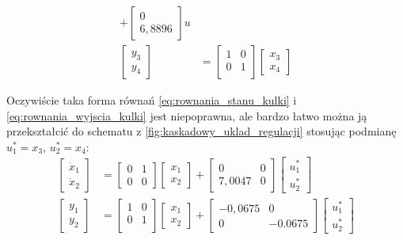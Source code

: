 \begin{align}
+
\begin{bmatrix}
    0 \\ 6,8896
\end{bmatrix}
u \label{eq:rownania_stanu_belki} \\%
\begin{bmatrix}
    y_3 \\ y_4
\end{bmatrix}
&= \begin{bmatrix}
    1 & 0 \\
    0 & 1 \\
\end{bmatrix}
\begin{bmatrix}
    x_3 \\ x_4
\end{bmatrix} \label{eq:rownania_wyjscia_belki} 
\end{align}

Oczywiście taka forma równań \eqref{eq:rownania_stanu_kulki} i \eqref{eq:rownania_wyjscia_kulki} jest niepoprawna, ale bardzo łatwo można ją przekształcić do schematu z \cref{fig:kaskadowy_uklad_regulacji} stosując podmianę $u_1^* = x_3$, $u_2^* = x_4$: %
\begin{align}
\begin{bmatrix}
    \dot{x}_1 \\ \dot{x}_2
\end{bmatrix}
&= \begin{bmatrix}
    0 & 1 \\
    0 & 0
\end{bmatrix}
\begin{bmatrix}
x_1 \\ x_2
\end{bmatrix}
+
\begin{bmatrix}
    0 & 0 \\ 7,0047 & 0
\end{bmatrix}
\begin{bmatrix}
    u_1^* \\ u_2^*
\end{bmatrix} \label{eq:rownania_stanu_kulki2} \\
\begin{bmatrix}
    y_1 \\ y_2
\end{bmatrix}
&= \begin{bmatrix}
    1 & 0 \\
    0 & 1 \\
\end{bmatrix}
\begin{bmatrix}
    x_1 \\ x_2
\end{bmatrix}
+ \begin{bmatrix}
    -0,0675 & 0 \\
    0 & -0.0675
\end{bmatrix}
\begin{bmatrix}
    u_1^* \\ u_2^*
\end{bmatrix} \label{eq:rownania_wyjscia_kulki2}
\end{align}

